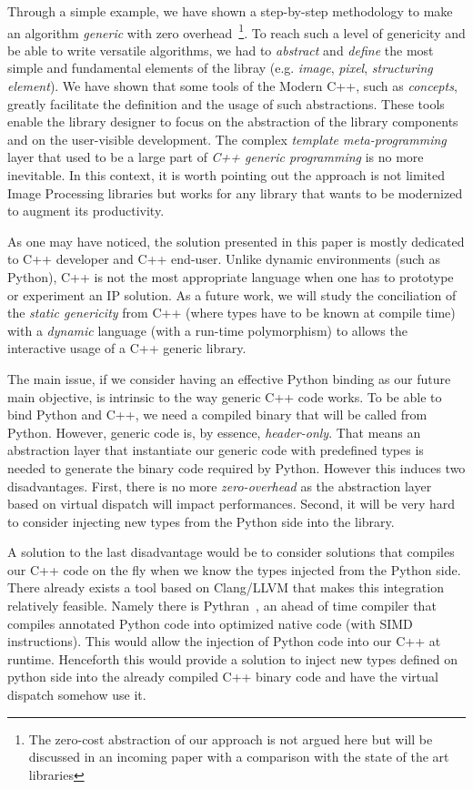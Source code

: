\vspace{1cm}

Through a simple example, we have shown a step-by-step methodology to make an algorithm \emph{generic} with zero
overhead~\footnote{The zero-cost abstraction of our approach is not argued here but will be discussed in an incoming
  paper with a comparison with the state of the art libraries}. To reach such a level of genericity and be able to write
versatile algorithms, we had to \emph{abstract} and \emph{define} the most simple and fundamental elements of the libray
(e.g. \emph{image}, \emph{pixel}, \emph{structuring element}). We have shown that some tools of the Modern C++, such as
\emph{concepts}, greatly facilitate the definition and the usage of such abstractions. These tools enable the library
designer to focus on the abstraction of the library components and on the user-visible development. The complex
\emph{template meta-programming} layer that used to be a large part of \emph{C++ generic programming} is no more
inevitable. In this context, it is worth pointing out the approach is not limited Image Processing libraries but works
for any library that wants to be modernized to augment its productivity.

As one may have noticed, the solution presented in this paper is mostly dedicated to C++ developer and C++ end-user.
Unlike dynamic environments (such as Python), C++ is not the most appropriate language when one has to prototype or
experiment an IP solution. As a future work, we will study the conciliation of the \emph{static genericity} from C++
(where types have to be known at compile time) with a \emph{dynamic} language (with a run-time polymorphism) to allows
the interactive usage of a C++ generic library.

The main issue, if we consider having an effective Python binding as our future main objective, is intrinsic to the way
generic C++ code works. To be able to bind Python and C++, we need a compiled binary that will be called from Python.
However, generic code is, by essence, \emph{header-only}. That means an abstraction layer that instantiate our generic
code with predefined types is needed to generate the binary code required by Python. However this induces two
disadvantages. First, there is no more \emph{zero-overhead} as the abstraction layer based on virtual dispatch will
impact performances. Second, it will be very hard to consider injecting new types from the Python side into the library.

A solution to the last disadvantage would be to consider solutions that compiles our C++ code on the fly when we know
the types injected from the Python side. There already exists a tool based on Clang/LLVM that makes this integration
relatively feasible. Namely there is Pythran~\cite{guelton.2015.pythran}, an ahead of time compiler that compiles
annotated Python code into optimized native code (with SIMD instructions). This would allow the injection of Python code
into our C++ at runtime. Henceforth this would provide a solution to inject new types defined on python side into the
already compiled C++ binary code and have the virtual dispatch somehow use it.

